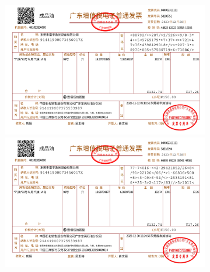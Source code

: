 \documentclass[a4paper]{article}
\begin{document}
	
	\begin{figure}
		\centering %
		\begin{subfigure}{0.95\linewidth}
			\includegraphics[width=\linewidth]{software/1}
			\includegraphics[width=\linewidth]{software/2}
		\end{subfigure}
	\end{figure} 
	
\end{document}
